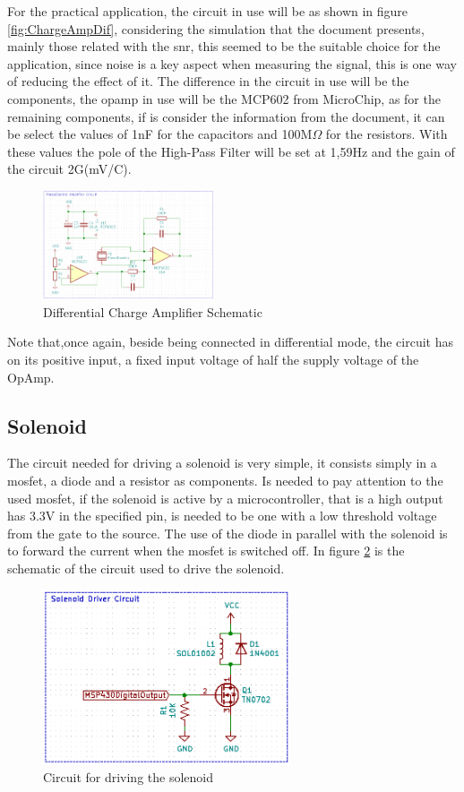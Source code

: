 For the practical application, the  circuit in use will be as shown in figure \ref{fig:ChargeAmpDif}, considering the simulation that the document \cite{bartolomeSignalConditioningPiezoelectric2010} presents, mainly those related with the \acrshort{snr}, this seemed to be the suitable choice for the application, since noise is a key aspect when measuring the signal, this is one way of reducing the effect of it. The difference in the circuit in use will be the components, the \acrshort{opamp} in use will be the MCP602 from MicroChip, as for the remaining components, if is consider the information from the document, it can be select the values of 1nF for the capacitors and 100M$\Omega$ for the resistors. With these values the pole of the High-Pass Filter will be set at 1,59Hz and the gain of the circuit 2G(mV/C).
\begin{figure}[]
    \centering
    \includegraphics[width=0.45\textwidth]{Chapters/4CHP/Figures/piezoAmpcirc.PNG}
    \caption{Differential Charge Amplifier Schematic}
    \label{fig:ChargeAmpDifSCH}
\end{figure}
Note that,once again, beside being connected in differential mode, the circuit has on its positive input, a fixed input voltage of half the supply voltage of the OpAmp.
\subsection{Solenoid}
The circuit needed for driving a solenoid is very simple, it consists simply in a \acrshort{mosfet}, a diode and a resistor as components. Is needed to pay attention to the used \acrshort{mosfet}, if the solenoid is active by a microcontroller, that is a high output has 3.3V in the specified pin, is needed to be one with a low threshold voltage from the gate to the source. The use of the diode in parallel with the solenoid is to forward the current when the \acrshort{mosfet} is switched off. In figure \ref{fig:solenoidshc} is the schematic of the circuit used to drive the solenoid.
\begin{figure}[]
    \centering
    \includegraphics[width=0.65\textwidth]{Chapters/4CHP/Figures/SolenoidDriver.PNG}
    \caption{Circuit for driving the solenoid}
    \label{fig:solenoidshc}
\end{figure}
